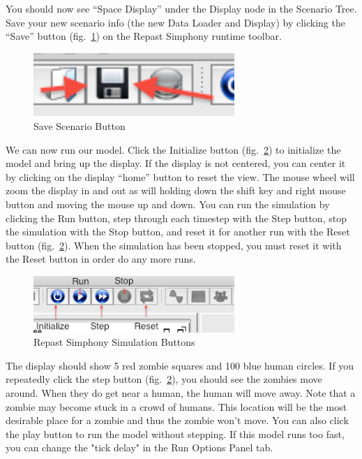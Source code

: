 \documentclass[11pt]{amsart}
\begin{document}
You should now see ``Space Display'' under the Display node in the Scenario Tree. Save your new scenario info (the new Data Loader and Display) by clicking the ``Save'' button (fig.~\ref{fig:save_button}) on the Repast Simphony runtime toolbar.

\begin{figure}[h]
\begin{center}
\vspace{.2in}
\centerline {
\includegraphics[width=3in]{GettingStartedImages/save_button.png}
}
\caption{Save Scenario Button}
\label{fig:save_button}
\end{center}
\end{figure}


We can now run our model. Click the Initialize button (fig.~\ref{fig:buttons}) to initialize the model and bring up the display. If the display is not centered, you can center it by clicking on the display ``home'' button to reset the view. The mouse wheel will zoom the display in and out as will holding down the shift key and right mouse button and moving the mouse up and down. You can run the simulation by clicking the Run button, step through each timestep with the Step button, stop the simulation with the Stop button, and reset it for another run with the Reset button (fig.~\ref{fig:buttons}). When the simulation has been stopped, you must reset it with the Reset button in order do any more runs.

\begin{figure}[h]
\begin{center}
\vspace{.2in}
\centerline {
\includegraphics[width=3in]{GettingStartedImages/buttons.png}
}
\caption{Repast Simphony Simulation Buttons}
\label{fig:buttons}
\end{center}
\end{figure}

The display should show 5 red zombie squares and 100 blue human circles. If you repeatedly click the step button  (fig.~\ref{fig:buttons}), you should see the zombies move around. When they do get near a human, the human will move away. Note that a zombie may become stuck in a crowd of humans. This location will be the most desirable place for a zombie and thus the zombie won't move. You can also click the play button to run the model without stepping. If this model runs too fast, you can change the "tick delay" in the Run Options Panel tab.
\end{document}

